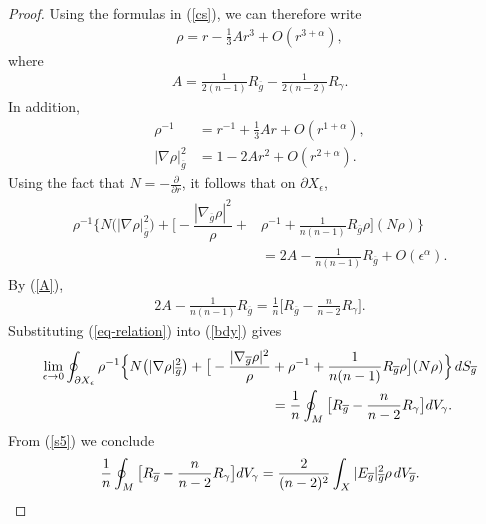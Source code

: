 \documentclass{amsart}
\newcommand{\hs}{\hskip.02in}
\theoremstyle{definition}
\theoremstyle{remark}
\numberwithin{equation}{section}
\begin{document}
\begin{proof}
Using the formulas in (\ref{cs}), we can therefore write
\begin{align*}
\rho = r - \frac{1}{3} A r^3 + O(r^{3+\alpha}),
\end{align*}
where
\begin{align} \label{A}
A = \frac{1}{2(n-1)} R_{\overline{g}} - \frac{1}{2(n-2)} R_{\gamma}.
\end{align}
In addition,
\begin{align*}
\rho^{-1} &= r^{-1} + \frac{1}{3} A r + O(r^{1+\alpha}), \\
|\nabla \rho|^2_{\overline{g}} &= 1 - 2 A r^2 + O(r^{2+\alpha}).
\end{align*}
Using the fact that $N = - \frac{\partial}{\partial r}$, it follows that on $\partial X_{\epsilon}$,
\begin{align} \label{bdy}  \begin{split}
\rho^{-1} \Big\{ N \big( |\nabla \rho|^2_{\overline{g}} \big) +    \big[ - \dfrac{|\nabla_{\overline{g}} \rho|^2}{\rho} + & \rho^{-1} +  \frac{1}{n(n-1)}R_{\overline{g}} \rho \big]( N \rho ) \Big\} \\
& = 2 A - \frac{1}{n(n-1)} R_{\overline{g}} + O(\epsilon^\alpha).
\end{split}
\end{align}
By (\ref{A}),
\begin{align}\label{eq-relation}
2 A - \frac{1}{n(n-1)} R_{\overline{g}} = \frac{1}{n} \big[ R_{\overline{g}} - \frac{n}{n-2}  R_{\gamma} \big].
\end{align}
Substituting (\ref{eq-relation}) into (\ref{bdy}) gives
\begin{align} \label{limit} \begin{split}
\lim_{\epsilon \to 0} \oint_{\partial X_{\epsilon}} \rho^{-1} \Big\{ N \big( |\nabla \rho|^2_{\overline{g}} \big) +    \big[ - \dfrac{|\nabla_{\overline{g}} \rho|^2}{\rho}  & + \rho^{-1} + \frac{1}{n(n-1)}R_{\overline{g}} \rho \big]( N \rho ) \Big\} \hs   dS_{\overline{g}}  \\
 & = \frac{1}{n} \oint_{M} \big[ R_{\overline{g}} -  \frac{n}{n-2} R_{\gamma} \big] dV_{\gamma}.
\end{split}
\end{align}
From (\ref{s5}) we conclude
\begin{align} \label{s55}
\frac{1}{n} \oint_{M} \big[ R_{\overline{g}} -  \frac{n}{n-2} R_{\gamma} \big] dV_{\gamma} = \frac{2}{(n-2)^2}  \int_{X} | E_{\overline{g}}|^2_{\overline{g}} \rho\hs dV_{\overline{g}}.
\end{align}

\end{proof}
\end{document}
